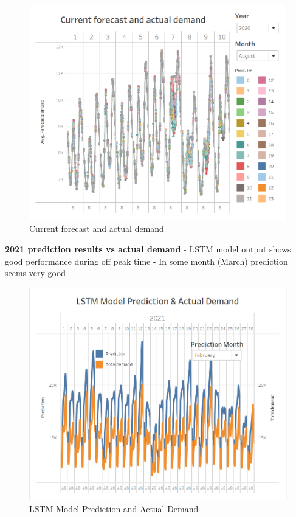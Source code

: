 \documentclass[mstat,12pt]{unswthesis}
\begin{document}
\begin{figure}[H]
\includegraphics{snapshots1/Slide 5 snapshot 2.png}
\caption{Current forecast and actual demand}\label{4.7}
\end{figure}

\textbf{2021 prediction results vs actual demand} \newline \newline -
LSTM model output shows good performance during off peak time \newline -
In some month (March) prediction seems very good

\begin{figure}[H]
\includegraphics{snapshots1/Slide 6 snapshot 1.png}
\caption{LSTM Model Prediction and Actual Demand}\label{4.8}
\end{figure}
\end{document}
